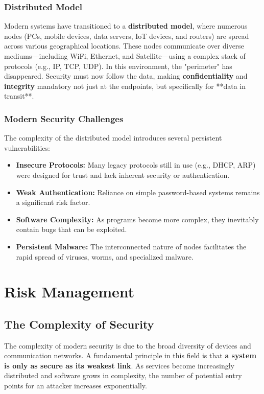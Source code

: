 \subsubsection*{Distributed Model}
Modern systems have transitioned to a \textbf{distributed model}, where numerous nodes (PCs, mobile devices, data servers, IoT devices, and routers) are spread across various geographical locations. These nodes communicate over diverse mediums—including WiFi, Ethernet, and Satellite—using a complex stack of protocols (e.g., IP, TCP, UDP).
In this environment, the "perimeter" has disappeared. Security must now follow the data, making \textbf{confidentiality} and \textbf{integrity} mandatory not just at the endpoints, but specifically for **data in transit**.

\subsubsection*{Modern Security Challenges}
The complexity of the distributed model introduces several persistent vulnerabilities:
\begin{itemize}
    \item \textbf{Insecure Protocols:} Many legacy protocols still in use (e.g., DHCP, ARP) were designed for trust and lack inherent security or authentication.
    \item \textbf{Weak Authentication:} Reliance on simple password-based systems remains a significant risk factor.
    \item \textbf{Software Complexity:} As programs become more complex, they inevitably contain bugs that can be exploited.
    \item \textbf{Persistent Malware:} The interconnected nature of nodes facilitates the rapid spread of viruses, worms, and specialized malware.
\end{itemize}

\section{Risk Management}

\subsection{The Complexity of Security}
The complexity of modern security is due to the broad diversity of devices and communication networks. A fundamental principle in this field is that \textbf{a system is only as secure as its weakest link}. As services become increasingly distributed and software grows in complexity, the number of potential entry points for an attacker increases exponentially.

